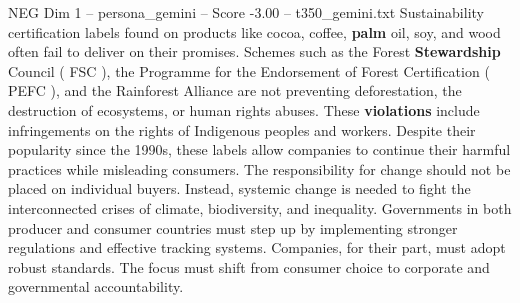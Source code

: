 \begin{textsample}{NEG Dim 1 – persona\_gemini – Score -3.00 – t350\_gemini.txt}  \label{ex:f1_neg_001}
Sustainability certification labels found on products like cocoa, coffee, \textbf{palm} oil, soy, and wood often fail to deliver on their promises.
Schemes such as the Forest \textbf{Stewardship} Council ( FSC ), the Programme for the Endorsement of Forest Certification ( PEFC ), and the Rainforest Alliance are not preventing deforestation, the destruction of ecosystems, or human rights abuses.
These \textbf{violations} include infringements on the rights of Indigenous peoples and workers.
Despite their popularity since the 1990s, these labels allow companies to continue their harmful practices while misleading consumers.
The responsibility for change should not be placed on individual buyers.
Instead, systemic change is needed to fight the interconnected crises of climate, biodiversity, and inequality.
Governments in both producer and consumer countries must step up by implementing stronger regulations and effective tracking systems.
Companies, for their part, must adopt robust standards.
The focus must shift from consumer choice to corporate and governmental accountability.

\end{textsample}
